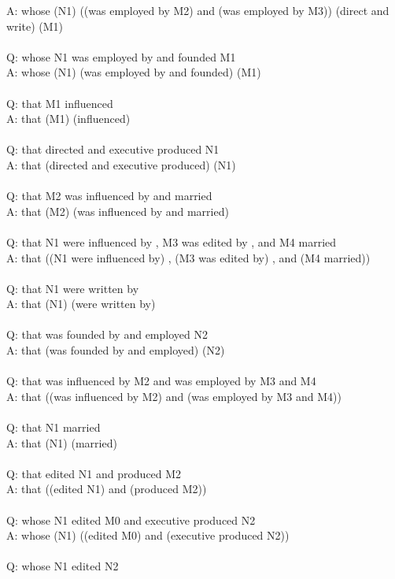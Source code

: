 \documentclass{article} \usepackage{iclr2022_conference,times}
\begin{document}
{A: whose (N1) ((was employed by M2) and (was employed by M3)) (direct and write) (M1) \\
 \\
Q: whose N1 was employed by and founded M1 \\
A: whose (N1) (was employed by and founded) (M1) \\
 \\
Q: that M1 influenced \\
A: that (M1) (influenced) \\
 \\
Q: that directed and executive produced N1 \\
A: that (directed and executive produced) (N1) \\
 \\
Q: that M2 was influenced by and married \\
A: that (M2) (was influenced by and married) \\
 \\
Q: that N1 were influenced by , M3 was edited by , and M4 married \\
A: that ((N1 were influenced by) , (M3 was edited by) , and (M4 married)) \\
 \\
Q: that N1 were written by \\
A: that (N1) (were written by) \\
 \\
Q: that was founded by and employed N2 \\
A: that (was founded by and employed) (N2) \\
 \\
Q: that was influenced by M2 and was employed by M3 and M4  \\
A: that ((was influenced by M2) and (was employed by M3 and M4)) \\
 \\
Q: that N1 married \\
A: that (N1) (married) \\
 \\
Q: that edited N1 and produced M2 \\
A: that ((edited N1) and (produced M2)) \\
 \\
Q: whose N1 edited M0 and executive produced N2 \\
A: whose (N1) ((edited M0) and (executive produced N2)) \\
 \\
Q: whose N1 edited N2 \\
}
\end{document}

